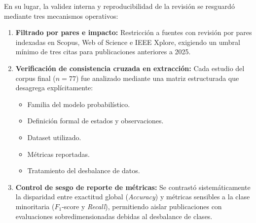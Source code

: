 En su lugar, la validez interna y reproducibilidad de la revisión se resguardó mediante tres mecanismos operativos:
\begin{enumerate}
    \item \textbf{Filtrado por pares e impacto:} Restricción a fuentes con revisión por pares indexadas en Scopus, Web of Science e IEEE Xplore, exigiendo un umbral mínimo de tres citas para publicaciones anteriores a 2025.
    \item \textbf{Verificación de consistencia cruzada en extracción:} Cada estudio del corpus final ($n=77$) fue analizado mediante una matriz estructurada que desagrega explícitamente: 
    \begin{itemize}
        \item Familia del modelo probabilístico.
        \item Definición formal de estados y observaciones.
        \item Dataset utilizado.
        \item Métricas reportadas.
        \item Tratamiento del desbalance de datos.
    \end{itemize}
    \item \textbf{Control de sesgo de reporte de métricas:} Se contrastó sistemáticamente la disparidad entre exactitud global (\textit{Accuracy}) y métricas sensibles a la clase minoritaria ($F_1$-score y \textit{Recall}), permitiendo aislar publicaciones con evaluaciones sobredimensionadas debidas al desbalance de clases.
\end{enumerate}